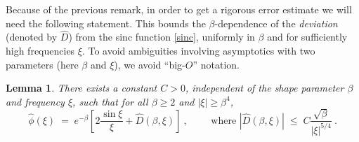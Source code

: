 \documentclass[10pt]{article}
\newcommand{\be}{\begin{equation}}
\newcommand{\ee}{\end{equation}}
\newtheorem{lem}[thm]{Lemma}
\newcommand{\freq}{\beta}          %
\begin{document}
Because of the previous remark, in order to get a rigorous error estimate
we will need the following statement.
This bounds the $\freq$-dependence of the {\em deviation} (denoted by $\hat D$)
from the sinc function
\eqref{sinc}, uniformly in $\freq$ and for sufficiently high frequencies $\xi$.
To avoid ambiguities involving asymptotics with two parameters
(here $\freq$ and $\xi$), we avoid ``big-$O$'' notation.

\begin{lem} %
  There exists a constant $C>0$, independent
  of the shape parameter $\freq$ and frequency $\xi$, such that for all
  $\freq \ge 2$ and $|\xi|\ge\freq^4$,
  \be
  \hat\phi(\xi) \;=\; e^{-\beta}\left[ 2\frac{\sin \xi}{\xi}
    + \hat D(\freq,\xi) \right]
  ~,\qquad \mbox{ where }   |\hat D(\freq,\xi)| \; \le \;
  C \frac{\sqrt{\freq}}{|\xi|^{5/4}}
  ~.
  \label{EShat3}
  \ee
  \label{l:EShat3}
\end{lem}
\end{document}
